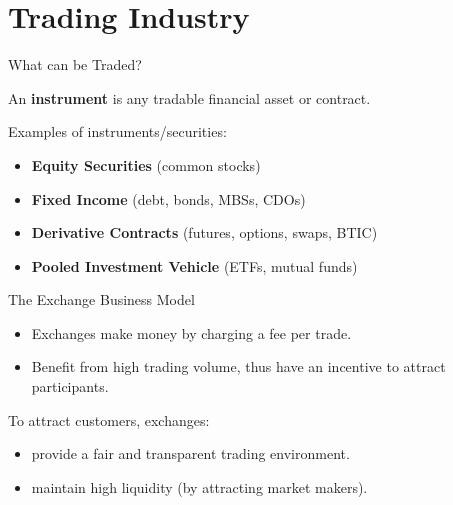 \section{Trading Industry}

\begin{frame}{What can be Traded?}
  \begin{sqt:definition}
    An \textbf{instrument} is any tradable financial asset or contract.
  \end{sqt:definition}
  \vspace{0.3cm}
  Examples of instruments/securities:
  \begin{itemize}
    \item \textbf{Equity Securities} (common stocks)
    \item \textbf{Fixed Income} (debt, bonds, MBSs, CDOs)
    \item \textbf{Derivative Contracts} (futures, options, swaps, BTIC)
    \item \textbf{Pooled Investment Vehicle} (ETFs, mutual funds)
  \end{itemize}
\end{frame}

\begin{frame}{The Exchange Business Model}
  \begin{itemize}
    \item Exchanges make money by charging a fee per trade.
    \item Benefit from high trading volume, thus have an incentive to attract participants.
  \end {itemize}

  \begin{sqt:result}
    To attract customers, exchanges:
    \begin{itemize}
      \item provide a fair and transparent trading environment.
      \item maintain high liquidity (by attracting market makers).
    \end{itemize}
  \end{sqt:result}
\end{frame}

